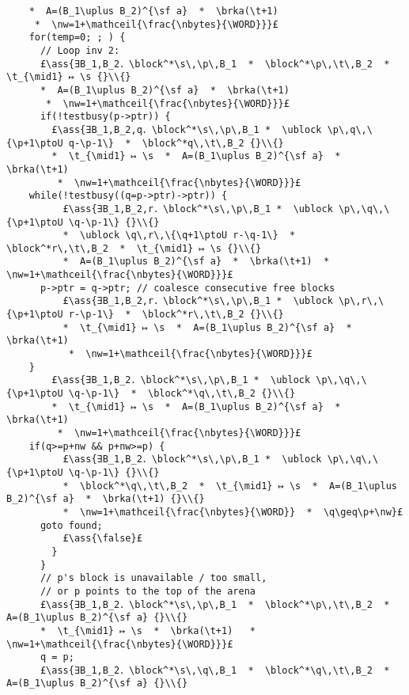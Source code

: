 \documentclass[12pt,a4paper]{article}
\makeatletter
\newcommand{\ml}[2][t]{\mbox{\mdseries\begin{tabular}[#1]{@{}L@{}}#2\end{tabular}}}
\newcommand{\ass}[1]{\ensuremath{{\color{blue}\left\{\ml[c]{#1}\right\}}}}
\newcommand{\block}{\mathop{\emph{block}}}
\newcommand{\ublock}{\mathop{\emph{ublock}}}
\newcommand{\s}{{\tt s}}
\renewcommand{\t}{{\tt t}}
\newcommand{\p}{{\tt p}}
\newcommand{\q}{{\tt q}}
\newcommand{\brka}{\mathop{\emph{brka}}}
\newcommand{\nw}{{\tt nw}}
\newcommand{\nbytes}{{\tt nbytes}}
\newcommand{\WORD}{{\tt WORD}}
\newcommand{\mathceil}[1]{\left\lceil#1\right\rceil}
\newcommand{\ptoU}{\mathbin{↦_{\sf u}}}
\makeatother
\begin{document}
\begin{lstlisting}
    *  A=(B_1\uplus B_2)^{\sf a}  *  \brka(\t+1) 
     *  \nw=1+\mathceil{\frac{\nbytes}{\WORD}}}£
    for(temp=0; ; ) {
      // Loop inv 2:
      £\ass{∃B_1,B_2．\block^*\s\,\p\,B_1  *  \block^*\p\,\t\,B_2  *  \t_{\mid1} ↦ \s {}\\{}
      *  A=(B_1\uplus B_2)^{\sf a}  *  \brka(\t+1)
       *  \nw=1+\mathceil{\frac{\nbytes}{\WORD}}}£
      if(!testbusy(p->ptr)) {
        £\ass{∃B_1,B_2,q．\block^*\s\,\p\,B_1 *  \ublock \p\,q\,\{\p+1\ptoU q-\p-1\}  *  \block^*q\,\t\,B_2 {}\\{}
        *  \t_{\mid1} ↦ \s  *  A=(B_1\uplus B_2)^{\sf a}  *  \brka(\t+1) 
         *  \nw=1+\mathceil{\frac{\nbytes}{\WORD}}}£ 
	while(!testbusy((q=p->ptr)->ptr)) {
          £\ass{∃B_1,B_2,r．\block^*\s\,\p\,B_1 *  \ublock \p\,\q\,\{\p+1\ptoU \q-\p-1\} {}\\{}
          *  \ublock \q\,r\,\{\q+1\ptoU r-\q-1\}  *  \block^*r\,\t\,B_2  *  \t_{\mid1} ↦ \s {}\\{}
          *  A=(B_1\uplus B_2)^{\sf a}  *  \brka(\t+1)  *  \nw=1+\mathceil{\frac{\nbytes}{\WORD}}}£ 
	  p->ptr = q->ptr; // coalesce consecutive free blocks
          £\ass{∃B_1,B_2,r．\block^*\s\,\p\,B_1 *  \ublock \p\,r\,\{\p+1\ptoU r-\p-1\}  *  \block^*r\,\t\,B_2 {}\\{}
          *  \t_{\mid1} ↦ \s  *  A=(B_1\uplus B_2)^{\sf a}  *  \brka(\t+1) 
           *  \nw=1+\mathceil{\frac{\nbytes}{\WORD}}}£ 
 	}
        £\ass{∃B_1,B_2．\block^*\s\,\p\,B_1 *  \ublock \p\,\q\,\{\p+1\ptoU \q-\p-1\}  *  \block^*\q\,\t\,B_2 {}\\{}
        *  \t_{\mid1} ↦ \s  *  A=(B_1\uplus B_2)^{\sf a}  *  \brka(\t+1) 
         *  \nw=1+\mathceil{\frac{\nbytes}{\WORD}}}£ 
	if(q>=p+nw && p+nw>=p) {
          £\ass{∃B_1,B_2．\block^*\s\,\p\,B_1 *  \ublock \p\,\q\,\{\p+1\ptoU \q-\p-1\} {}\\{}
          *  \block^*\q\,\t\,B_2  *  \t_{\mid1} ↦ \s  *  A=(B_1\uplus B_2)^{\sf a}  *  \brka(\t+1) {}\\{}
          *  \nw=1+\mathceil{\frac{\nbytes}{\WORD}}  *  \q\geq\p+\nw}£ 
	  goto found;
          £\ass{\false}£
        } 
      }
      // p's block is unavailable / too small,
      // or p points to the top of the arena
      £\ass{∃B_1,B_2．\block^*\s\,\p\,B_1  *  \block^*\p\,\t\,B_2  *  A=(B_1\uplus B_2)^{\sf a} {}\\{}
      *  \t_{\mid1} ↦ \s  *  \brka(\t+1)   *  \nw=1+\mathceil{\frac{\nbytes}{\WORD}}}£
      q = p;
      £\ass{∃B_1,B_2．\block^*\s\,\q\,B_1  *  \block^*\q\,\t\,B_2  *  A=(B_1\uplus B_2)^{\sf a} {}\\{}

\end{lstlisting}
\end{document}
